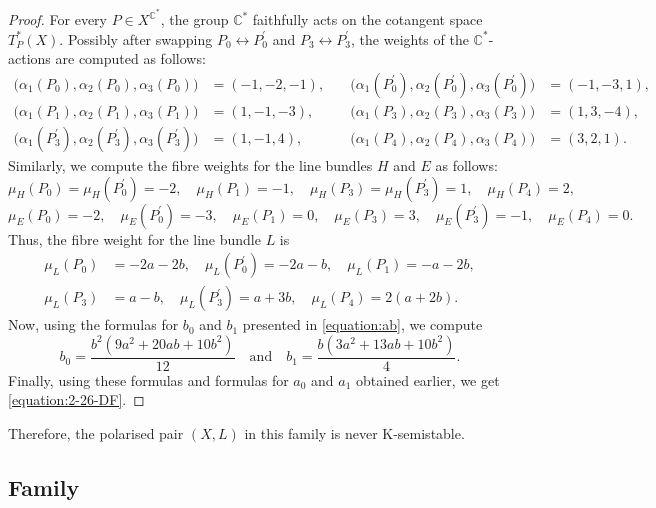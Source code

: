 \documentclass[12pt]{amsart}
\theoremstyle{definition}
\theoremstyle{remark}
\newcommand{\C}{\mathbb{C}}
\begin{document}
\begin{proof}
For every $P\in X^{\C^*}$, the group $\mathbb{C}^*$ faithfully acts on the cotangent space $T_P^*(X)$.
Possibly after swapping $P_0\leftrightarrow P_0^\prime$ and $P_3\leftrightarrow P_3^\prime$,
the weights of the $\mathbb{C}^*$-actions are computed as follows:
\begin{align*}
\big(\alpha_1(P_0),\alpha_2(P_0),\alpha_3(P_0)\big)&=(-1,-2,-1),&\quad
\big(\alpha_1(P_0^\prime),\alpha_2(P_0^\prime),\alpha_3(P_0^\prime)\big)&=(-1,-3,1),\\
\big(\alpha_1(P_1),\alpha_2(P_1),\alpha_3(P_1)\big)&=(1,-1,-3),&\quad
\big(\alpha_1(P_3),\alpha_2(P_3),\alpha_3(P_3)\big)&=(1,3,-4),\\
\big(\alpha_1(P_3^\prime),\alpha_2(P_3^\prime),\alpha_3(P_3^\prime)\big)&=(1,-1,4),&\quad
\big(\alpha_1(P_4),\alpha_2(P_4),\alpha_3(P_4)\big)&=(3,2,1).
\end{align*}
Similarly, we compute the fibre weights for the line bundles $H$ and $E$ as follows:
$$
\mu_H(P_0)=\mu_H(P_0^\prime)=-2,\quad \mu_H(P_1)=-1,\quad \mu_H(P_3)=\mu_H(P_3^\prime)=1,\quad \mu_H(P_4)=2,
$$
$$
\mu_E(P_0)=-2, \quad \mu_E(P_0^\prime)=-3,\quad \mu_E(P_1)=0,\quad \mu_E(P_3)=3,\quad  \mu_E(P_3^\prime)=-1, \quad \mu_E(P_4)=0.
$$
Thus, the fibre weight for the line bundle $L$ is
\begin{align*}
\mu_L(P_0)&=-2a-2b,\quad
\mu_L(P_0^\prime)=-2a-b,\quad
\mu_L(P_1)=-a-2b,\\
\mu_L(P_3)&=a-b,\quad
\mu_L(P_3^\prime)=a+3b,\quad
\mu_L(P_4)=2(a+2b).
\end{align*}
Now, using the formulas for $b_0$ and $b_1$ presented in \eqref{equation:ab}, we compute
$$
b_0=\frac{b^2(9a^2+20ab+10b^2)}{12}
\quad
\text{and}
\quad
b_1=\frac{b(3a^2+13ab+10b^2)}{4}.
$$
Finally, using these formulas and formulas for $a_0$ and $a_1$ obtained earlier, we get \eqref{equation:2-26-DF}.
\end{proof}

Therefore, the polarised pair $(X,L)$ in this family is never K-semistable.






\subsection{Family }
\label{subsection:3-16}
\end{document}
